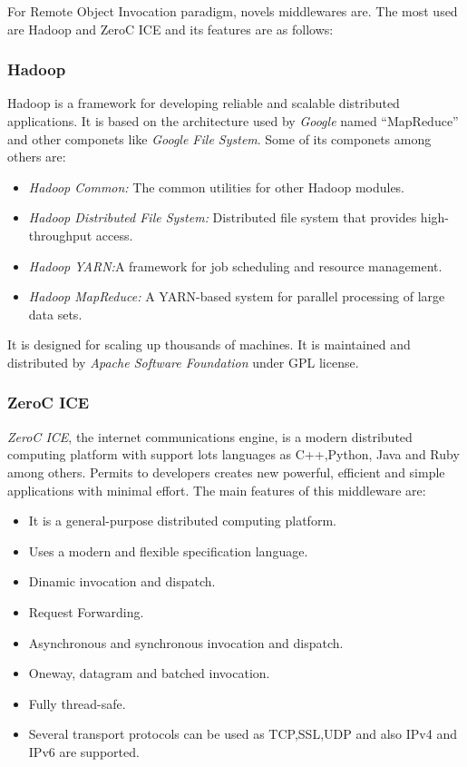 For Remote Object Invocation paradigm, novels middlewares are. The most used are
Hadoop and ZeroC \ac{ICE} and its features are as follows:

\subsubsection{Hadoop}
Hadoop is a framework for developing  reliable and scalable
distributed applications. It is based on
the architecture used by \emph{Google} named ``MapReduce'' and other componets
like \emph{Google File System}. 
Some of its componets among others are:
\begin{itemize}
\item \emph{Hadoop Common:} The common utilities for other Hadoop modules.
\item \emph{Hadoop Distributed File System:} Distributed file system that
  provides high-throughput access.
\item \emph{Hadoop YARN:}A framework for job scheduling and resource management.
\item \emph{Hadoop MapReduce:} A YARN-based system for parallel processing of
  large data sets.
\end{itemize}
It is designed for scaling up thousands of machines. It
is maintained and distributed by \emph{Apache Software Foundation} under GPL license.
 
\subsubsection{ZeroC ICE}
\emph{ZeroC \ac{ICE}}, the internet communications engine, is a modern distributed computing
platform with support lots languages as C++,Python, Java and Ruby among others.
Permits to developers creates new powerful, efficient and simple applications
with minimal effort.
The main features of this middleware are:
\begin{itemize}
\item It is a general-purpose distributed computing platform.
\item Uses a modern and flexible specification language.
\item Dinamic invocation and dispatch.
\item Request Forwarding.
\item Asynchronous and synchronous invocation and dispatch.
\item Oneway, datagram and batched invocation.
\item Fully thread-safe.
\item Several transport protocols can be used as \ac{TCP},\ac{SSL},\ac{UDP} and also \ac{IP}v4 and
  \ac{IP}v6 are supported.
\end{itemize}

